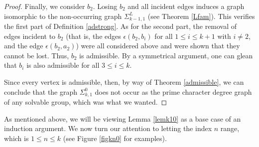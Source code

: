 \documentclass[11pt]{amsart}
\theoremstyle{definition}
\theoremstyle{remark}
\numberwithin{equation}{section}
\newcommand{\SL}[2]{\Sigma_{#1,#2}^L} %
\newcommand{\SZ}[2]{\Sigma_{#1,#2}^0} %
\begin{document}
\begin{proof}
Finally, we consider $b_2$. Losing $b_2$ and all incident edges induces a graph isomorphic to the non-occurring graph $\SL{k-1}{1}$ (see Theorem \ref{Lfam}). This verifies the first part of Definition \ref{adstrong}. As for the second part, the removal of edges incident to $b_2$ (that is, the edges $\epsilon(b_2,b_i)$ for all $1\leq i\leq k+1$ with $i\neq2$, and the edge $\epsilon(b_2,a_2)$) were all considered above and were shown that they cannot be lost. Thus, $b_2$ is admissible. By a symmetrical argument, one can glean that $b_i$ is also admissible for all $3\leq i\leq k$.

Since every vertex is admissible, then, by way of Theorem \ref{admissible}, we can conclude that the graph $\SZ{k}{1}$ does not occur as the prime character degree graph of any solvable group, which was what we wanted.
\end{proof}

As mentioned above, we will be viewing Lemma \ref{lemk10} as a base case of an induction argument. We now turn our attention to letting the index $n$ range, which is $1\leq n\leq k$ (see Figure \ref{figkn0} for examples).
\end{document}
